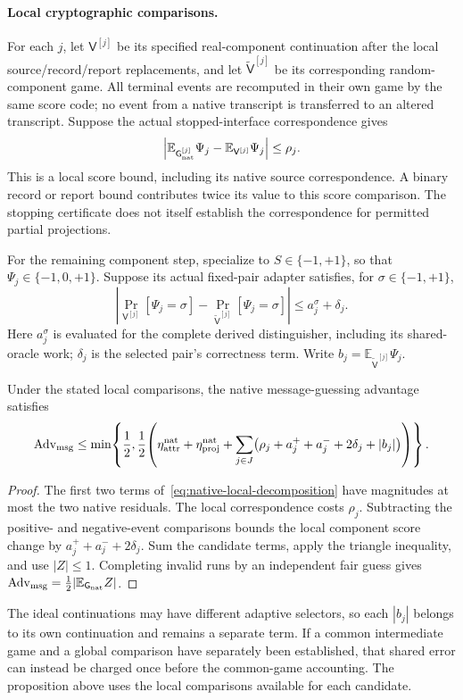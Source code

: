 \paragraph{Local cryptographic comparisons.}
For each $j$, let $\mathsf V^{[j]}$ be its specified real-component
continuation after the local source/record/report replacements, and let
$\widetilde{\mathsf V}^{[j]}$ be its corresponding random-component game.
All terminal events are recomputed in their own game by the same score code;
no event from a native transcript is transferred to an altered transcript.
Suppose the actual stopped-interface correspondence gives
\[
 \left|\mathbb E_{\mathsf G_{\rm nat}^{[j]}}\Psi_j
       -\mathbb E_{\mathsf V^{[j]}}\Psi_j\right|\le\rho_j.
\]
This is a local score bound, including its native source correspondence.
A binary record or report bound contributes twice its value to this score
comparison.  The stopping certificate does not itself establish the
correspondence for permitted partial projections.

For the remaining component step, specialize to $S\in\{-1,+1\}$, so that
$\Psi_j\in\{-1,0,+1\}$.  Suppose its actual fixed-pair adapter satisfies,
for $\sigma\in\{-1,+1\}$,
\[
 \left|\Pr_{\mathsf V^{[j]}}[\Psi_j=\sigma]
       -\Pr_{\widetilde{\mathsf V}^{[j]}}[\Psi_j=\sigma]\right|
 \le a_j^\sigma+\delta_j.
\]
Here $a_j^\sigma$ is evaluated for the complete derived distinguisher,
including its shared-oracle work; $\delta_j$ is the selected pair's correctness term. Write
$b_j=\mathbb E_{\widetilde{\mathsf V}^{[j]}}\Psi_j$.

\begin{proposition}
\label{prop:native-local-accounting}
Under the stated local comparisons, the native message-guessing advantage
satisfies
\[
 \operatorname{Adv}_{\rm msg}
 \le\min\!\left\{\frac12,\frac12\!\left(
 \eta_{\rm attr}^{\rm nat}+\eta_{\rm proj}^{\rm nat}
 +\sum_{j\in J}
    \bigl(\rho_j+a_j^++a_j^-+2\delta_j+|b_j|\bigr)
 \right)\right\}.
\]
\end{proposition}
\begin{proof}
The first two terms of~\eqref{eq:native-local-decomposition} have magnitudes
at most the two native residuals.  The local correspondence costs $\rho_j$.
Subtracting the positive- and negative-event comparisons bounds the local
component score change by $a_j^++a_j^-+2\delta_j$.  Sum the candidate terms,
apply the triangle inequality, and use $|Z|\le1$.  Completing invalid runs
by an independent fair guess gives
$\operatorname{Adv}_{\rm msg}=\tfrac12|\mathbb E_{\mathsf G_{\rm nat}}Z|$.
\end{proof}

The ideal continuations may have different adaptive selectors, so each
$|b_j|$ belongs to its own continuation and remains a separate term.
If a common intermediate game and a global
comparison have separately been established, that shared error can instead be
charged once before the common-game accounting. The proposition above uses
the local comparisons available for each candidate.
